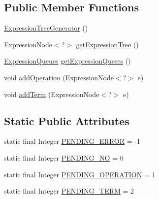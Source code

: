 \subsection*{Public Member Functions}
\begin{DoxyCompactItemize}
\item 
\hyperlink{classit_1_1emarolab_1_1cagg_1_1core_1_1language_1_1syntax_1_1expressionTree_1_1ExpressionTreeGenerator_a4b17f519bb15a3b1ca195ba11a6ff4a0}{Expression\-Tree\-Generator} ()
\item 
Expression\-Node$<$?$>$ \hyperlink{classit_1_1emarolab_1_1cagg_1_1core_1_1language_1_1syntax_1_1expressionTree_1_1ExpressionTreeGenerator_aa37c2063224be4bf81abdf1b68b3cd65}{get\-Expression\-Tree} ()
\item 
\hyperlink{classit_1_1emarolab_1_1cagg_1_1core_1_1language_1_1syntax_1_1expressionTree_1_1ExpressionTreeGenerator_1_1ExpressionQueues}{Expression\-Queues} \hyperlink{classit_1_1emarolab_1_1cagg_1_1core_1_1language_1_1syntax_1_1expressionTree_1_1ExpressionTreeGenerator_ab6d782ecff5cf72d027ddf4a848fc44f}{get\-Expression\-Queses} ()
\item 
void \hyperlink{classit_1_1emarolab_1_1cagg_1_1core_1_1language_1_1syntax_1_1expressionTree_1_1ExpressionTreeGenerator_acdff6b2756b769bd7ee58f8b61628bcc}{add\-Operation} (Expression\-Node$<$?$>$ e)
\item 
void \hyperlink{classit_1_1emarolab_1_1cagg_1_1core_1_1language_1_1syntax_1_1expressionTree_1_1ExpressionTreeGenerator_a17fe667e689df2d901012f984c8415e3}{add\-Term} (Expression\-Node$<$?$>$ e)
\end{DoxyCompactItemize}
\subsection*{Static Public Attributes}
\begin{DoxyCompactItemize}
\item 
static final Integer \hyperlink{classit_1_1emarolab_1_1cagg_1_1core_1_1language_1_1syntax_1_1expressionTree_1_1ExpressionTreeGenerator_aa1cc8c563ef91ec7d8c42a38f91ac73a}{P\-E\-N\-D\-I\-N\-G\-\_\-\-E\-R\-R\-O\-R} = -\/1
\item 
static final Integer \hyperlink{classit_1_1emarolab_1_1cagg_1_1core_1_1language_1_1syntax_1_1expressionTree_1_1ExpressionTreeGenerator_aafcadc158111ff425dfd1cbc86592eaa}{P\-E\-N\-D\-I\-N\-G\-\_\-\-N\-O} = 0
\item 
static final Integer \hyperlink{classit_1_1emarolab_1_1cagg_1_1core_1_1language_1_1syntax_1_1expressionTree_1_1ExpressionTreeGenerator_a01b70c565663efa0dec9c2ea700352f0}{P\-E\-N\-D\-I\-N\-G\-\_\-\-O\-P\-E\-R\-A\-T\-I\-O\-N} = 1
\item 
static final Integer \hyperlink{classit_1_1emarolab_1_1cagg_1_1core_1_1language_1_1syntax_1_1expressionTree_1_1ExpressionTreeGenerator_a9f3b4791532465adb7950a8f63a06f33}{P\-E\-N\-D\-I\-N\-G\-\_\-\-T\-E\-R\-M} = 2
\end{DoxyCompactItemize}
